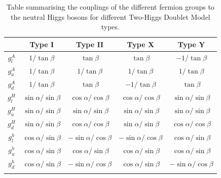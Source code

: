 \begin{table}[h]
\centering
\renewcommand{\arraystretch}{1.5} %
\setlength{\tabcolsep}{12pt} %
\begin{tabular}{|c|c|c|c|c|}
\hline
        & Type I                     & Type II                     & Type X                                        & Type Y                      \\ \hline \hline
$g_l^A$ & $1/\tan{\beta}$            & $\tan{\beta}$               & $\tan{\beta}$    & $-1/\tan{\beta}$            \\ \arrayrulecolor{lightgray} \hline
$g_u^A$ & $1/\tan{\beta}$            & $1/\tan{\beta}$             & $1/\tan{\beta}$                               & $1/\tan{\beta}$             \\ \arrayrulecolor{lightgray} \hline
$g_d^A$ & $1/\tan{\beta}$            & $\tan{\beta}$               & $-1/\tan{\beta}$                              & $\tan{\beta}$               \\ \arrayrulecolor{lightgray} \hline
$g_l^H$ & $\sin{\alpha}/\sin{\beta}$ & $\cos{\alpha}/\cos{\beta}$  & $\cos{\alpha}/\cos{\beta}$                    & $\sin{\alpha}/\sin{\beta}$  \\ \arrayrulecolor{lightgray} \hline
$g_u^H$ & $\sin{\alpha}/\sin{\beta}$ & $\sin{\alpha}/\sin{\beta}$  & $\sin{\alpha}/\sin{\beta}$                    & $\sin{\alpha}/\sin{\beta}$  \\ \arrayrulecolor{lightgray} \hline
$g_d^H$ & $\sin{\alpha}/\sin{\beta}$ & $\cos{\alpha}/\cos{\beta}$  & $\sin{\alpha}/\sin{\beta}$                    & $\cos{\alpha}/\cos{\beta}$  \\ \arrayrulecolor{lightgray} \hline
$g_l^h$ & $\cos{\alpha}/\sin{\beta}$ & $-\sin{\alpha}/\cos{\beta}$ & $-\sin{\alpha}/\cos{\beta}$                   & $\cos{\alpha}/\sin{\beta}$  \\ \arrayrulecolor{lightgray} \hline
$g_u^h$ & $\cos{\alpha}/\sin{\beta}$ & $\cos{\alpha}/\sin{\beta}$  & $\cos{\alpha}/\sin{\beta}$                    & $\cos{\alpha}/\sin{\beta}$  \\ \arrayrulecolor{lightgray} \hline
$g_d^h$ & $\cos{\alpha}/\sin{\beta}$ & $-\sin{\alpha}/\cos{\beta}$ & $\cos{\alpha}/\sin{\beta}$                    & $-\sin{\alpha}/\cos{\beta}$ \\ \arrayrulecolor{black} \hline
\end{tabular}
\caption{Table summarising the couplings of the different fermion groups to the neutral Higgs bosons for different Two-Higgs Doublet Model types.}
\label{Table:Chapter2_2HDM-Couplings}
\end{table}

